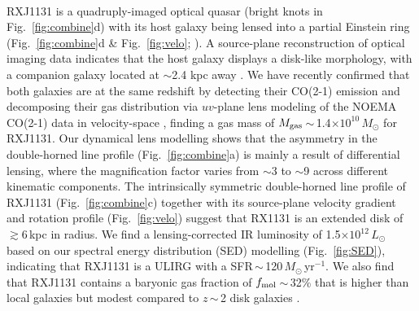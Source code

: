 \documentclass[11pt,a4paper,twoside,graphicx,color]{article}
\newcommand{\Lsun}{\mbox{$L_{\odot}$}\xspace}
\newcommand{\LIR}{\mbox{$L_{\rm IR}$}\xspace}
\newcommand{\Msun}{\mbox{$M_{\odot}$}\xspace}
\newcommand{\sfrU}{\mbox{\Msun\,yr$^{-1}$}\xspace}
\newcommand{\bco}{\mbox{CO(2-1)}\xspace}
\newcommand{\Fig}[1]{Fig.~\ref{fig:#1}}
\newcommand{\E}[1]{\mbox{$\times10^{#1}$}}
\newcommand{\eq}{\,=\,}
\newcommand{\ssim}{\,$\sim$\,}
\begin{document}
\vspace{0.2em}
\\
\indent
RXJ1131 is a quadruply-imaged optical quasar (bright knots in \Fig{combine}d)
with its host galaxy being lensed
into a partial Einstein ring (\Fig{combine}d \& \Fig{velo}; \citealt{Sluse03a}).
A source-plane reconstruction
of optical imaging data indicates that the host galaxy displays a disk-like morphology, with
a companion galaxy located at $\sim$2.4 kpc away
\citep[\Fig{combine}f;][]{Claeskens06a, Brewer08a}.
We have recently confirmed that both galaxies are at the same redshift by detecting their
\bco emission and decomposing their gas distribution
via $uv$-plane lens modeling
of the NOEMA \bco data
 in velocity-space \citep[\Fig{combine}c \& e;][]{Leung16b}, finding a gas mass of
$M_{\rm gas}$\ssim1.4\E{10}\,\Msun for RXJ1131.
Our dynamical lens modelling
shows that the asymmetry in the double-horned line profile (\Fig{combine}a)
is mainly a result of differential lensing, where
the magnification factor varies from $\sim$3 to $\sim$9 across
different kinematic components.
The intrinsically symmetric double-horned line
profile of RXJ1131 (\Fig{combine}c) together with its source-plane velocity gradient
and rotation profile (\Fig{velo})
suggest that RX1131 is an extended disk of $\gtrsim$6\,kpc in radius.
We find a lensing-corrected IR luminosity of 1.5\E{12}\,\Lsun based
on our spectral energy distribution (SED) modelling (\Fig{SED}),
indicating that RXJ1131 is a ULIRG with a SFR\ssim120\,\sfrU.
We also find that
RXJ1131 contains
a baryonic gas fraction of $f_{\rm mol}$\ssim32\%
that is higher than local galaxies but modest compared to $z$\ssim2 disk galaxies \citep{Daddi10a}.
\end{document}
